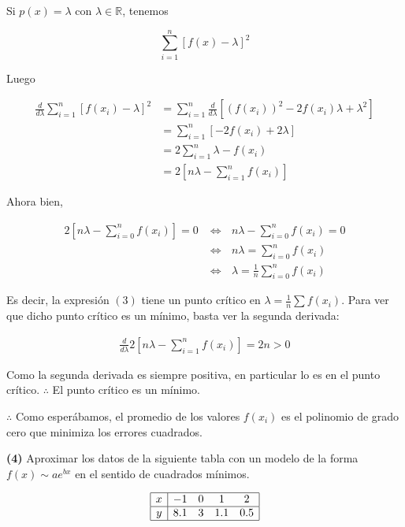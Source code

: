 \documentclass[12pt]{article}
\begin{document}
Si $p(x) = \lambda$ con $\lambda \in \mathbb{R}$, tenemos 

\begin{equation}
    \sum_{i=1}^n \left[ f(x) - \lambda \right]^2
\end{equation}

Luego 

\begin{align*}
\frac{d}{d\lambda} \sum_{i=1}^n \left[ f(x_i) - \lambda \right]^2 
&= \sum_{i=1}^n \frac{d}{d\lambda} \left[ \left( f(x_i) \right)^2 - 2f(x_i)\lambda +
\lambda^2  \right] \\ 
&= \sum_{i=1}^n \left[ -2f(x_i) + 2\lambda \right]  \\ 
&= 2 \sum_{i=1}^n \lambda - f(x_i)  \\ 
&= 2 \left[ n \lambda - \sum_{i=1}^n f(x_i) \right] 
\end{align*}

Ahora bien, 

\begin{align*}
2 \left[ n\lambda - \sum_{i=0}^n f(x_i) \right]  = 0 
&\iff ~ ~ ~ 
n\lambda - \sum_{i=0}^n f(x_i) = 0\\
&\iff ~ ~ ~ 
n\lambda = \sum_{i=0}^n f(x_i) \\ 
&\iff ~ ~ ~ 
\lambda = \frac{1}{n} \sum_{i=0}^n f(x_i)
\end{align*}

Es decir, la expresión $(3)$ tiene un punto crítico en $\lambda = \frac{1}{n}
\sum f(x_i)$. Para ver que dicho punto crítico es un mínimo, basta ver la
segunda derivada: 

\begin{align*}
    \frac{d}{d\lambda} 2 \left[ n \lambda - \sum_{i=1}^n f(x_i) \right] = 2n > 0
\end{align*}

Como la segunda derivada es siempre positiva, en particular lo es en el punto
crítico. $\therefore $ El punto crítico es un mínimo. 

$\therefore $ Como esperábamos, el promedio de los valores $f(x_i)$ es el
polinomio de grado cero que minimiza los errores cuadrados.

\pagebreak 

\begin{myframe}
    \textbf{(4)} Aproximar los datos de la siguiente tabla con un modelo de la
    forma $f(x) \sim ae^{bx}$ en el sentido de cuadrados mínimos.

\[
\begin{array}{|c|cccc|}
\hline
x & -1 & 0 & 1 & 2 \\
\hline
y & 8.1 & 3 & 1.1 & 0.5 \\
\hline
\end{array}
\]
\end{myframe}
\end{document}
